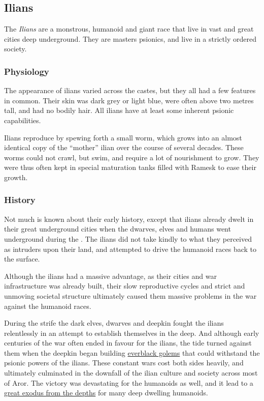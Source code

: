 \subsection{Ilians}
\label{sec:Ilians}

The \emph{Ilians} are a monstrous, humanoid and giant race that live in vast
and great cities deep underground. They are masters psionics, and live in a
strictly ordered society.

\subsubsection{Physiology}

The appearance of ilians varied across the castes, but they all had a few
features in common. Their skin was dark grey or light blue, were often above
two metres tall, and had no bodily hair. All ilians have at least some
inherent psionic capabilities.

Ilians reproduce by spewing forth a small worm, which grows into an almost
identical copy of the ``mother'' ilian over the course of several decades.
These worms could not crawl, but swim, and require a lot of nourishment to
grow. They were thus often kept in special maturation tanks filled with Ramesk
to ease their growth.

\subsubsection{History}

Not much is known about their early history, except that ilians already dwelt
in their great underground cities when the dwarves, elves and humans went
underground during the . The ilians did not take kindly to
what they perceived as intruders upon their land, and attempted to drive the
humanoid races back to the surface.

Although the ilians had a massive advantage, as their cities and war
infrastructure was already built, their slow reproductive cycles and strict
and unmoving societal structure ultimately caused them massive problems in
the war against the humanoid races.

During the strife the dark elves, dwarves and deepkin fought the ilians
relentlessly in an attempt to establish themselves in the deep. And although
early centuries of the war often ended in favour for the ilians, the tide
turned against them when the deepkin began building \hyperref[sec:Everblack
  Golem]{everblack golems} that could withstand the psionic powers of the
ilians. These constant wars cost both sides heavily, and ultimately culminated
in the downfall of the ilian culture and society across most of Aror. The
victory was devastating for the humanoids as well, and it lead to a
\hyperref[sec:Exodus from the Depths]{great exodus from the depths} for many
deep dwelling humanoids.

